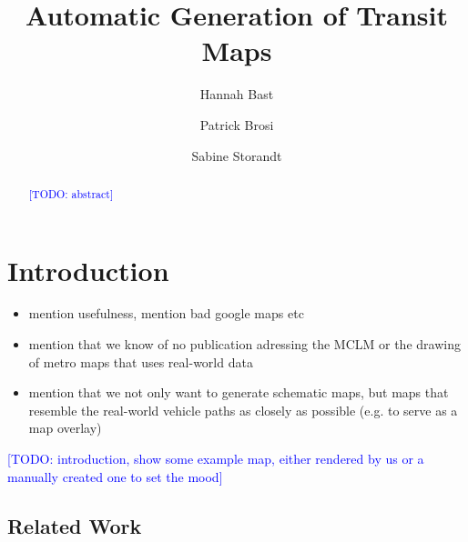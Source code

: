 \documentclass{llncs}
\newcommand\todo[1]{\textcolor{blue}{[TODO: #1]}}
\begin{document}
%
\mainmatter
%
\title{Automatic Generation of Transit Maps}
%
%
\author{Hannah Bast \and Patrick Brosi \and
Sabine Storandt}
%
%
%

\maketitle

\begin{abstract}
	\todo{abstract}
\end{abstract}


%
\section{Introduction}\label{SEC:intro}
%

\begin{itemize}
	\item mention usefulness, mention bad google maps etc
	\item mention that we know of no publication adressing the MCLM or the drawing of metro maps that uses real-world data
	\item mention that we not only want to generate schematic maps, but maps that resemble the real-world vehicle paths as closely as possible (e.g. to serve as a map overlay)
\end{itemize}
\todo{introduction, show some example map, either rendered by us or a manually created one to set the mood}


%
\subsection{Related Work}\label{SEC:related}
%
\end{document}
